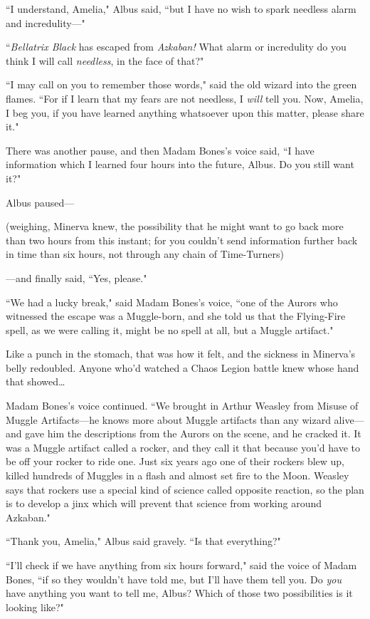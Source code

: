``I understand, Amelia," Albus said, ``but I have no wish to spark needless alarm and incredulity—"

``\emph{Bellatrix Black} has escaped from \emph{Azkaban!} What alarm or incredulity do you think I will call \emph{needless}, in the face of that?"

``I may call on you to remember those words," said the old wizard into the green flames. ``For if I learn that my fears are not needless, I \emph{will} tell you. Now, Amelia, I beg you, if you have learned anything whatsoever upon this matter, please share it."

There was another pause, and then Madam Bones's voice said, ``I have information which I learned four hours into the future, Albus. Do you still want it?"

Albus paused—

(weighing, Minerva knew, the possibility that he might want to go back more than two hours from this instant; for you couldn't send information further back in time than six hours, not through any chain of Time-Turners)

—and finally said, ``Yes, please."

``We had a lucky break," said Madam Bones's voice, ``one of the Aurors who witnessed the escape was a Muggle-born, and she told us that the Flying-Fire spell, as we were calling it, might be no spell at all, but a Muggle artifact."

Like a punch in the stomach, that was how it felt, and the sickness in Minerva's belly redoubled. Anyone who'd watched a Chaos Legion battle knew whose hand that showed{\ldots}

Madam Bones's voice continued. ``We brought in Arthur Weasley from Misuse of Muggle Artifacts—he knows more about Muggle artifacts than any wizard alive—and gave him the descriptions from the Aurors on the scene, and he cracked it. It was a Muggle artifact called a rocker, and they call it that because you'd have to be off your rocker to ride one. Just six years ago one of their rockers blew up, killed hundreds of Muggles in a flash and almost set fire to the Moon. Weasley says that rockers use a special kind of science called opposite reaction, so the plan is to develop a jinx which will prevent that science from working around Azkaban."

``Thank you, Amelia," Albus said gravely. ``Is that everything?"

``I'll check if we have anything from six hours forward," said the voice of Madam Bones, ``if so they wouldn't have told me, but I'll have them tell you. Do \emph{you} have anything you want to tell me, Albus? Which of those two possibilities is it looking like?"

